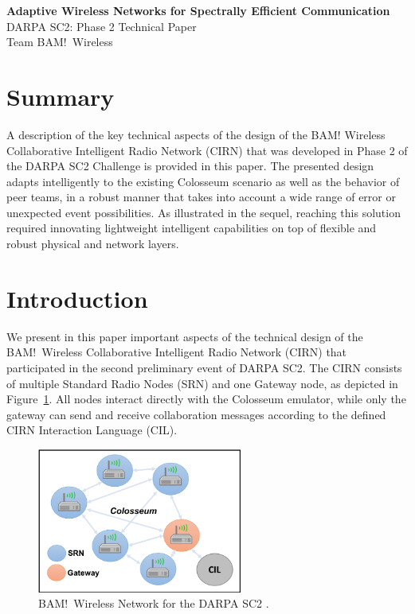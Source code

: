 \documentclass[11pt]{article}
\begin{document}
\begin{center}
\textbf{\Large Adaptive Wireless Networks for Spectrally Efficient Communication} \\[0.1in]
\Large DARPA SC2: Phase 2 Technical Paper \\
Team BAM!\ Wireless
\end{center}

\tableofcontents
\newpage

\listoffigures
\newpage
\section{Summary}
A description of the key technical aspects of the design of the BAM! Wireless Collaborative Intelligent Radio Network (CIRN) that was developed in Phase 2 of the DARPA SC2 Challenge is provided in this paper. The presented design adapts intelligently to the existing Colosseum scenario as well as the behavior of peer teams, in a robust manner that takes into account a wide range of error or unexpected event possibilities. As illustrated in the sequel, reaching this solution required innovating lightweight intelligent capabilities on top of flexible and robust physical and network layers.

\section{Introduction}
We present in this paper important aspects of the technical design of the BAM!\ Wireless Collaborative Intelligent Radio Network (CIRN) that participated in the second preliminary event of DARPA SC2. The CIRN consists of multiple Standard Radio Nodes (SRN) and one Gateway node, as depicted in Figure~\ref{fig:high-level}. All nodes interact directly with the Colosseum emulator, while only the gateway can send and receive collaboration messages according to the defined CIRN Interaction Language (CIL). 

 
\begin{figure} [htb]
 \centerline{
 \includegraphics[width = 0.6\textwidth]{Figures/SysBD.png}}
 \caption{BAM!\ Wireless Network for the DARPA SC2 \cite[Figure $1$]{func-report}.} 
 \label{fig:high-level}
 \end{figure} 
 
\end{document}
